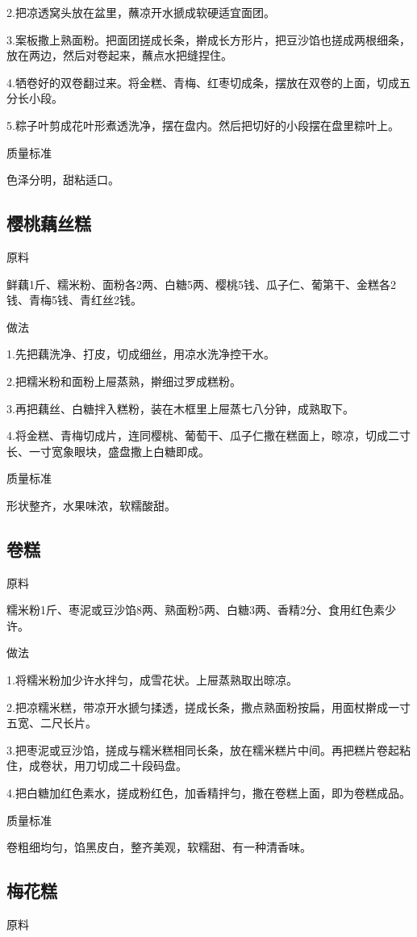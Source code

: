 \documentclass{ctexbook}
\begin{document}
2.把凉透窝头放在盆里，蘸凉开水搋成软硬适宜面团。

3.案板撒上熟面粉。把面团搓成长条，擀成长方形片，把豆沙馅也搓成两根细条，放在两边，然后对卷起来，蘸点水把缝捏住。

4.牺卷好的双卷翻过来。将金糕、青梅、红枣切成条，摆放在双卷的上面，切成五分长小段。

5.粽子叶剪成花叶形煮透洗净，摆在盘内。然后把切好的小段摆在盘里粽叶上。

质量标准

色泽分明，甜粘适口。
\subsection{樱桃藕丝糕}
原料

鲜藕1斤、糯米粉、面粉各2两、白糖5两、樱桃5钱、瓜子仁、葡第干、金糕各2钱、青梅5钱、青红丝2钱。

做法

1.先把藕洗净、打皮，切成细丝，用凉水洗净控干水。

2.把糯米粉和面粉上屉蒸熟，擀细过罗成糕粉。

3.再把藕丝、白糖拌入糕粉，装在木框里上屉蒸七八分钟，成熟取下。

4.将金糕、青梅切成片，连同樱桃、葡萄干、瓜子仁撒在糕面上，晾凉，切成二寸长、一寸宽象眼块，盛盘撒上白糖即成。

质量标准

形状整齐，水果味浓，软糯酸甜。
\subsection{卷糕}
原料

糯米粉1斤、枣泥或豆沙馅8两、熟面粉5两、白糖3两、香精2分、食用红色素少许。

做法

1.将糯米粉加少许水拌匀，成雪花状。上屉蒸熟取出晾凉。

2.把凉糯米糕，带凉开水搋匀揉透，搓成长条，撒点熟面粉按扁，用面杖擀成一寸五宽、二尺长片。

3.把枣泥或豆沙馅，搓成与糯米糕相同长条，放在糯米糕片中间。再把糕片卷起粘住，成卷状，用刀切成二十段码盘。

4.把白糖加红色素水，搓成粉红色，加香精拌匀，撒在卷糕上面，即为卷糕成品。

质量标准

卷粗细均匀，馅黑皮白，整齐美观，软糯甜、有一种清香味。
\subsection{梅花糕}
原料
\end{document}
